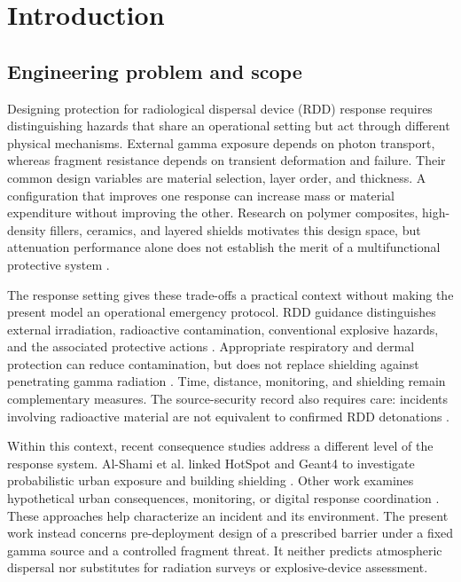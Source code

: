 \section{Introduction}
\subsection{Engineering problem and scope}
Designing protection for radiological dispersal device (RDD) response requires distinguishing hazards that share an operational setting but act through different physical mechanisms. External gamma exposure depends on photon transport, whereas fragment resistance depends on transient deformation and failure. Their common design variables are material selection, layer order, and thickness. A configuration that improves one response can increase mass or material expenditure without improving the other. Research on polymer composites, high-density fillers, ceramics, and layered shields motivates this design space, but attenuation performance alone does not establish the merit of a multifunctional protective system \cite{MoreEtAl2021,PrabhuEtAl2023,GilysEtAl2022,MarxRabiei2017CMF,Derradji2020Hybrid,Mehelli2021BallisticRadiation}.

The response setting gives these trade-offs a practical context without making the present model an operational emergency protocol. RDD guidance distinguishes external irradiation, radioactive contamination, conventional explosive hazards, and the associated protective actions \cite{IAEA2006FirstResponders,DHS2017RDD,DHS2025RDD}. Appropriate respiratory and dermal protection can reduce contamination, but does not replace shielding against penetrating gamma radiation \cite{REMM2026PPE,OSHA2026Radiation}. Time, distance, monitoring, and shielding remain complementary measures. The source-security record also requires care: incidents involving radioactive material are not equivalent to confirmed RDD detonations \cite{IAEA2024ITDB}.

Within this context, recent consequence studies address a different level of the response system. Al-Shami et al. linked HotSpot and Geant4 to investigate probabilistic urban exposure and building shielding \cite{AlShami2026}. Other work examines hypothetical urban consequences, monitoring, or digital response coordination \cite{ObooEtAl2024,AlrammahAlShareef2023,BrambillaEtAl2023}. These approaches help characterize an incident and its environment. The present work instead concerns pre-deployment design of a prescribed barrier under a fixed gamma source and a controlled fragment threat. It neither predicts atmospheric dispersal nor substitutes for radiation surveys or explosive-device assessment.

